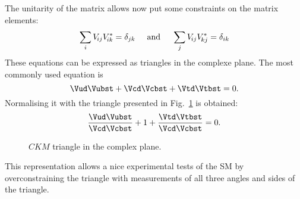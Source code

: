 The unitarity of the matrix allows now put some constraints on the matrix elements:
\begin{equation}
\sum_{i} V_{{\kern -0.1em}ij}V_{{\kern -0.1em}ik}^{*} = \delta_{jk}\hspace{0.5cm}\text{and}\hspace{0.5cm}
\sum_{j} V_{{\kern -0.1em}ij}V_{{\kern -0.1em}kj}^{*} = \delta_{ik}
\end{equation}
These equations can be expressed as triangles in the complexe plane. The most commonly used equation is
\begin{equation}
\Vud\Vubst + \Vcd\Vcbst + \Vtd\Vtbst = 0.
\end{equation}
Normalising it with \Vcd\Vcbst the triangle presented in Fig.~\ref{fig:ckmtheory} is obtained:
\begin{equation}
\frac{\Vud\Vubst}{\Vcd\Vcbst} + 1 + \frac{\Vtd\Vtbst}{\Vcd\Vcbst} = 0.
\end{equation}
\begin{figure}[tbp]
	\centering
	
	\caption{$CKM$ triangle in the complex plane.}
	\label{fig:ckmtheory}
\end{figure}
This representation allows a nice experimental tests of the \ac{SM} by overconstraining the triangle with measurements of all three
angles and sides of the triangle.
